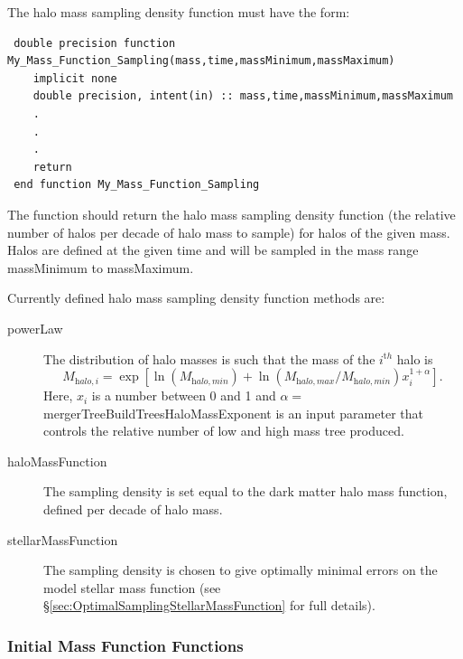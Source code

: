 The halo mass sampling density function must have the form:
\begin{verbatim}
 double precision function My_Mass_Function_Sampling(mass,time,massMinimum,massMaximum)
    implicit none
    double precision, intent(in) :: mass,time,massMinimum,massMaximum
    .
    .
    .
    return
 end function My_Mass_Function_Sampling
\end{verbatim}
The function should return the halo mass sampling density function (the relative number of halos per decade of halo mass to sample) for halos of the given {\normalfont \ttfamily mass}. Halos are defined at the given {\normalfont \ttfamily time} and will be sampled in the mass range {\normalfont \ttfamily massMinimum} to {\normalfont \ttfamily massMaximum}.

Currently defined halo mass sampling density function methods are:
\begin{description}
 \item [{\normalfont \ttfamily powerLaw}] The distribution of halo masses is such that the mass of the $i^{\mathrm th}$ halo is
\begin{equation}
 M_{\mathrm halo,i} = \exp\left[ \ln(M_{\mathrm halo,min}) + \ln\left({M_{\mathrm halo,max}/M_{\mathrm halo,min}}\right) x_i^{1+\alpha} \right].
\end{equation}
Here, $x_i$ is a number between 0 and 1 and $\alpha=${\normalfont \ttfamily mergerTreeBuildTreesHaloMassExponent} is an input parameter that controls the relative number of low and high mass tree produced. 
\item [{\normalfont \ttfamily haloMassFunction}] The sampling density is set equal to the dark matter halo mass function, defined per decade of halo mass.
\item [{\normalfont \ttfamily stellarMassFunction}] The sampling density is chosen to give optimally minimal errors on the model stellar mass function (see \S\ref{sec:OptimalSamplingStellarMassFunction} for full details).
\end{description}

\subsubsection{Initial Mass Function Functions}\label{sec:IMF_functions}

